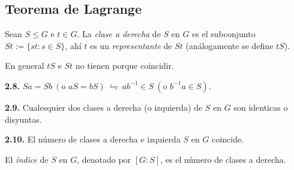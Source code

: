 \subsection*{Teorema de Lagrange}

\begin{definition}
    Sean \(S\leq G\) e \(t \in G\). La \emph{clase a derecha} de \(S\) en \(G\) es el subconjunto \(St := \{st : s \in S\}\), ahí \(t \) es un \emph{representante} de \(St\) (análogamente se define \(tS\)). 
\end{definition}


\begin{note}
    En general \(tS\) e \(St\) no tienen porque coincidir. %
\end{note}

\hypertarget{lemma28}{}
\begin{lemma}
    \textbf{2.8.} \(Sa = Sb \ (\text{o }aS = bS) \ \leftrightharpoons \ ab^{-1} \in S \ (\text{o }b^{-1}a \in S)\). 
\end{lemma}


\hypertarget{thm29}{}
\begin{theorem}
    \textbf{2.9.} Cualesquier dos clases a derecha (o izquierda) de \(S\) en \(G\) son identicas o disyuntas. 
\end{theorem}

\begin{theorem}
    \textbf{2.10.} El número de clases a derecha e izquierda \(S\) en \(G\) coincide. 
\end{theorem}

\begin{definition}
    El \emph{índice} de \(S\) en \(G\), denotado por \([G:S]\), es el número de clases a derecha. 
\end{definition}

